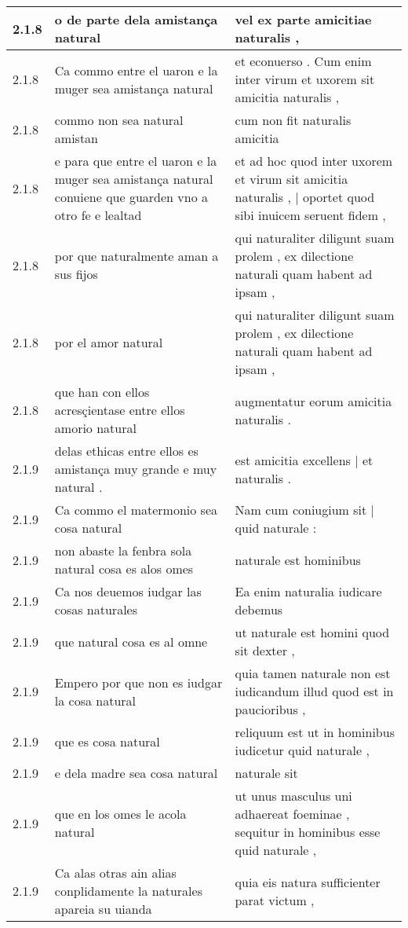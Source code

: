 \begin{tabular}{|p{1cm}|p{6.5cm}|p{6.5cm}|}
2.1.8 & o de parte dela amistança natural & vel ex parte amicitiae naturalis , \\\hline
2.1.8 & Ca commo entre el uaron e la muger sea amistança natural & et econuerso . Cum enim inter virum et uxorem sit amicitia naturalis , \\\hline
2.1.8 & commo non sea natural amistan & cum non fit naturalis amicitia \\\hline
2.1.8 & e para que entre el uaron e la muger sea amistança natural conuiene que guarden vno a otro fe e lealtad & et ad hoc quod inter uxorem et virum sit amicitia naturalis , | oportet quod sibi inuicem seruent fidem , \\\hline
2.1.8 & por que naturalmente aman a sus fijos & qui naturaliter diligunt suam prolem , ex dilectione naturali quam habent ad ipsam , \\\hline
2.1.8 & por el amor natural & qui naturaliter diligunt suam prolem , ex dilectione naturali quam habent ad ipsam , \\\hline
2.1.8 & que han con ellos acresçientase entre ellos amorio natural & augmentatur eorum amicitia naturalis . \\\hline
2.1.9 & delas ethicas entre ellos es amistança muy grande e muy natural . & est amicitia excellens | et naturalis . \\\hline
2.1.9 & Ca commo el matermonio sea cosa natural & Nam cum coniugium sit | quid naturale : \\\hline
2.1.9 & non abaste la fenbra sola natural cosa es alos omes & naturale est hominibus \\\hline
2.1.9 & Ca nos deuemos iudgar las cosas naturales & Ea enim naturalia iudicare debemus \\\hline
2.1.9 & que natural cosa es al omne & ut naturale est homini quod sit dexter , \\\hline
2.1.9 & Empero por que non es iudgar la cosa natural & quia tamen naturale non est iudicandum illud quod est in paucioribus , \\\hline
2.1.9 & que es cosa natural & reliquum est ut in hominibus iudicetur quid naturale , \\\hline
2.1.9 & e dela madre sea cosa natural & naturale sit \\\hline
2.1.9 & que en los omes le acola natural & ut unus masculus uni adhaereat foeminae , sequitur in hominibus esse quid naturale , \\\hline
2.1.9 & Ca alas otras ain alias conplidamente la naturales apareia su uianda & quia eis natura sufficienter parat victum , \\\hline

\end{tabular}
